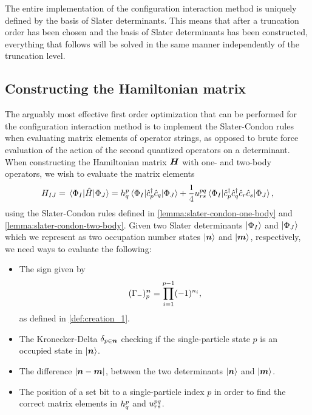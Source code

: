             The entire implementation of the configuration interaction method is
            uniquely defined by the basis of Slater determinants.
            This means that after a truncation order has been chosen and the
            basis of Slater determinants has been constructed, everything that
            follows will be solved in the same manner independently of the
            truncation level.

        \subsection{Constructing the Hamiltonian matrix}
            The arguably most effective first order optimization that can be
            performed for the configuration interaction method is to implement
            the Slater-Condon rules when evaluating matrix elements of operator
            strings, as opposed to brute force evaluation of the action of the
            second quantized operators on a determinant.
            When constructing the Hamiltonian matrix $\boldsymbol{H}$ with one- and
            two-body operators, we wish to evaluate the matrix elements
            \begin{align}
                H_{IJ}
                = \mel{\Phi_{I}}{\hat{H}}{\Phi_J}
                =
                h^{p}_{q}
                \mel{\Phi_{I}}{\hat{c}_{p}^{\dagger}\hat{c}_{q}}{\Phi_J}
                +
                \frac{1}{4}
                u^{pq}_{rs}
                \mel{\Phi_{I}}{
                    \hat{c}_{p}^{\dagger}
                    \hat{c}_{q}^{\dagger}
                    \hat{c}_{r}
                    \hat{c}_{s}
                }{\Phi_J},
            \end{align}
            using the Slater-Condon rules defined in
            \autoref{lemma:slater-condon-one-body} and
            \autoref{lemma:slater-condon-two-body}.
            Given two Slater determinants $\ket{\Phi_I}$ and $\ket{\Phi_J}$
            which we represent as two occupation number states $\ket{\boldsymbol{n}}$
            and $\ket{\boldsymbol{m}}$, respectively, we need ways to evaluate the
            following:
            \begin{itemize}
                \item The sign given by
                    \begin{align}
                        (\Gamma_{-})^{\boldsymbol{n}}_{p}
                        = \prod_{i = 1}^{p - 1}(-1)^{n_i},
                    \end{align}
                    as defined in \autoref{def:creation_1}.
                \item The Kronecker-Delta $\delta_{p \in \boldsymbol{n}}$ checking if
                    the single-particle state $p$ is an occupied state in
                    $\ket{\boldsymbol{n}}$.
                \item The difference $\abs{\boldsymbol{n} - \boldsymbol{m}}$, between the two
                    determinants $\ket{\boldsymbol{n}}$ and $\ket{\boldsymbol{m}}$.
                \item The position of a set bit to a single-particle index $p$
                    in order to find the correct matrix elements in
                    $h^{p}_{q}$ and $u^{pq}_{rs}$.
            \end{itemize}
